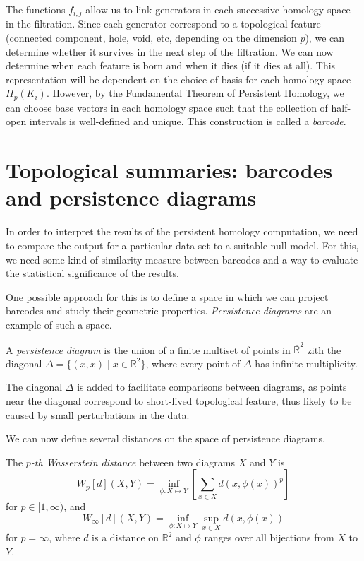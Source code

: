 \documentclass[a4paper,11pt,openany,extrafontsizes]{memoir}
\begin{document}
The functions $f_{i,j}$ allow us to link generators in each successive
homology space in the filtration. Since each generator correspond to a
topological feature (connected component, hole, void, etc, depending
on the dimension $p$), we can determine whether it survives in the
next step of the filtration. We can now determine when each feature is
born and when it dies (if it dies at all). This representation will be
dependent on the choice of basis for each homology space
$H_p(K_i)$. However, by the Fundamental Theorem of Persistent
Homology, we can choose base vectors in each homology space such that
the collection of half-open intervals is well-defined and unique. This
construction is called a \emph{barcode}.

\section{Topological summaries: barcodes and persistence diagrams}%
\label{sec:topol-summ}

In order to interpret the results of the persistent homology
computation, we need to compare the output for a particular data set
to a suitable null model. For this, we need some kind of similarity
measure between barcodes and a way to evaluate the statistical
significance of the results.

One possible approach for this is to define a space in which we can
project barcodes and study their geometric
properties. \emph{Persistence diagrams} are an example of such a
space.

\begin{defn}
  A \emph{persistence diagram} is the union of a finite multiset of
  points in $\overline{\mathbb{R}}^2$ zith the diagonal
  $\Delta = \{(x,x) \;|\; x\in\mathbb{R}^2\}$, where every point of
  $\Delta$ has infinite multiplicity.
\end{defn}

The diagonal $\Delta$ is added to facilitate comparisons between
diagrams, as points near the diagonal correspond to short-lived
topological feature, thus likely to be caused by small perturbations
in the data.

We can now define several distances on the space of persistence
diagrams.

\begin{defn}
  The \emph{$p$-th Wasserstein distance} between two diagrams $X$ and
  $Y$ is
  \[ W_p[d](X, Y) = \inf_{\phi:X\mapsto Y} \left[\sum_{x\in X} {d\left(x, \phi(x)\right)}^p\right] \]
  for $p\in [1,\infty)$, and
  \[ W_\infty[d](X, Y) = \inf_{\phi:X\mapsto Y} \sup_{x\in X} d\left(x,
      \phi(x)\right) \] for $p = \infty$, where $d$ is a distance on
  $\mathbb{R}^2$ and $\phi$ ranges over all bijections from $X$ to
  $Y$.
\end{defn}
\end{document}
